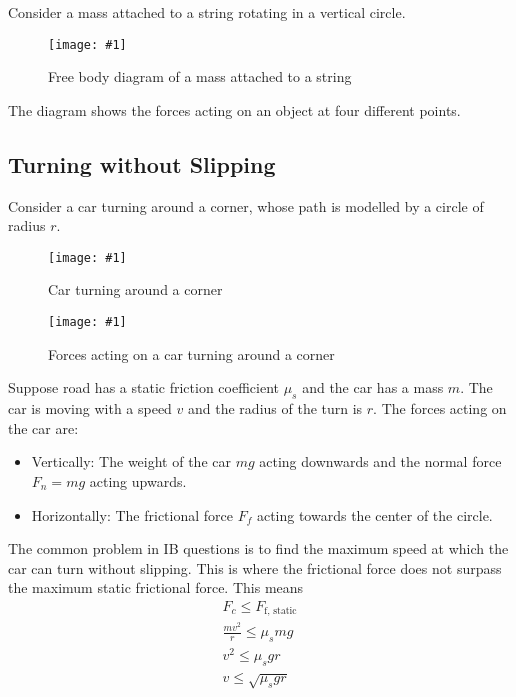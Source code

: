 \documentclass[a4paper,12pt]{article}
\newcommand{\img}[4]{\begin{center}
  \begin{figure}[H]
    \centering
    \texttt{[image: \#1]}
    \caption{#3}
    \label{fig:#4}
  \end{figure}
\end{center}}
\begin{document}
Consider a mass attached to a string rotating in a vertical circle.

\img{material/circular.png}{0.4}{Free body diagram of a mass attached to a string}{circular}

The diagram shows the forces acting on an object at four different points.


\pagebreak


\subsection{Turning without Slipping}

Consider a car turning around a corner, whose path is modelled by a circle of radius $r$.

\begin{minipage}{0.35\textwidth}
  \centering
  \img{material/turn1.png}{1}{Car turning around a corner}{carturn}
\end{minipage}\hspace{0.1\textwidth}%
\begin{minipage}{0.55\textwidth}
  \centering
  \img{material/turn2.png}{1}{Forces acting on a car turning around a corner}{carturnforces}
\end{minipage}


Suppose road has a static friction coefficient $\mu_s$ and the car has a mass $m$. The car is moving with a speed $v$ and the radius of the turn is $r$. The forces acting on the car are:
\begin{itemize}
  \item Vertically: The weight of the car $mg$ acting downwards and the normal force $F_n = mg$ acting upwards.
  \item Horizontally: The frictional force $F_f$ acting towards the center of the circle.
\end{itemize}

The common problem in IB questions is to find the maximum speed at which the car can turn without slipping. This is where the frictional force does not surpass the maximum static frictional force. This means
\begin{align*}
  F_c \le F_\text{f, static}  \\
  \frac{mv^2}{r} \le \mu_s mg \\
  v^2 \le \mu_s g r           \\
  v \le \sqrt{\mu_s g r}
\end{align*}

\pagebreak
\end{document}
